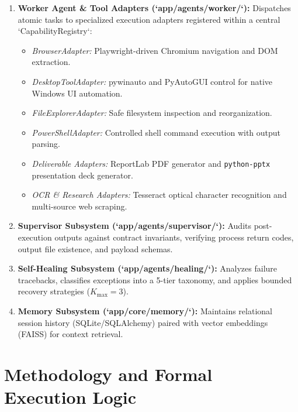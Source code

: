 \documentclass[conference]{IEEEtran}
\begin{document}
\begin{enumerate}
    \item \textbf{Worker Agent \& Tool Adapters (`app/agents/worker/`):} Dispatches atomic tasks to specialized execution adapters registered within a central `CapabilityRegistry`:
    \begin{itemize}
        \item \textit{BrowserAdapter:} Playwright-driven Chromium navigation and DOM extraction.
        \item \textit{DesktopToolAdapter:} pywinauto and PyAutoGUI control for native Windows UI automation.
        \item \textit{FileExplorerAdapter:} Safe filesystem inspection and reorganization.
        \item \textit{PowerShellAdapter:} Controlled shell command execution with output parsing.
        \item \textit{Deliverable Adapters:} ReportLab PDF generator and \texttt{python-pptx} presentation deck generator.
        \item \textit{OCR \& Research Adapters:} Tesseract optical character recognition and multi-source web scraping.
    \end{itemize}

    \item \textbf{Supervisor Subsystem (`app/agents/supervisor/`):} Audits post-execution outputs against contract invariants, verifying process return codes, output file existence, and payload schemas.

    \item \textbf{Self-Healing Subsystem (`app/agents/healing/`):} Analyzes failure tracebacks, classifies exceptions into a 5-tier taxonomy, and applies bounded recovery strategies ($K_{\text{max}}=3$).

    \item \textbf{Memory Subsystem (`app/core/memory/`):} Maintains relational session history (SQLite/SQLAlchemy) paired with vector embeddings (FAISS) for context retrieval.
\end{enumerate}

\section{Methodology and Formal Execution Logic}
\label{sec:methodology}
\end{document}
